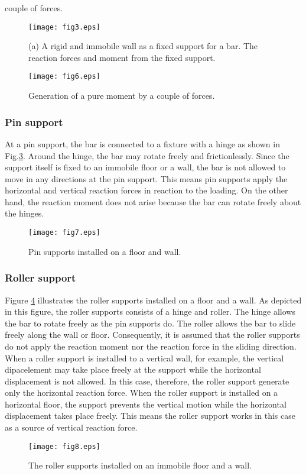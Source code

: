 \documentclass[10pt,a4j]{article}
\begin{document}
couple of forces.
\begin{figure}[h]
	\begin{center}
	\texttt{[image: fig3.eps]} 
	\end{center}
	\caption{(a) A rigid and immobile wall as a fixed support for a bar. 
	The reaction forces and moment  from the fixed support.} 
	\label{fig:fig3}
\end{figure}
\begin{figure}[h]
	\begin{center}
	\texttt{[image: fig6.eps]} 
	\end{center}
	\caption{Generation of a pure moment by a couple of forces.} 
	\label{fig:fig6}
\end{figure}
\subsubsection{Pin support}
At a pin support, the bar is connected to a fixture with a hinge 
as shown in Fig.\ref{fig:fig7}. Around the hinge, the bar may rotate 
freely and frictionlessly. Since the support itself is fixed to an immobile 
floor or a wall, the bar is not allowed to move in any directions at the 
pin support.  This means pin supports apply the horizontal and vertical 
reaction forces in reaction to the loading. On the other hand, the reaction 
moment does not arise because the bar can rotate freely about the hinges. 
\begin{figure}[h]
	\begin{center}
	\texttt{[image: fig7.eps]} 
	\end{center}
	\caption{Pin supports installed on a floor and wall.} 
	\label{fig:fig7}
\end{figure}
\subsubsection{Roller support}
Figure \ref{fig:fig8} illustrates the roller supports installed on a floor and a wall. 
As depicted in this figure, the roller supports consists of a hinge and roller. 
The hinge allows the bar to rotate freely as the pin supports do. 
The roller allows the bar to slide freely along the wall or floor.  
Consequently, it is assumed that the roller supports do not apply 
the reaction moment nor the reaction force in the sliding direction. 
When a roller support is installed to a vertical wall, for example, the vertical 
 dipacelement may take place freely at the support while the horizontal displacement 
is not allowed. In this case, therefore, the roller support generate only the horizontal 
reaction force. When the roller support is installed on a horizontal floor, 
the support prevents the vertical motion while the horizontal 
displacement takes place freely. This means the roller support works in this case 
as a source of vertical reaction force.
\begin{figure}[h]
	\begin{center}
	\texttt{[image: fig8.eps]} 
	\end{center}
	\caption{The roller supports installed on an immobile floor and a wall.} 
	\label{fig:fig8}
\end{figure}
\end{document}
